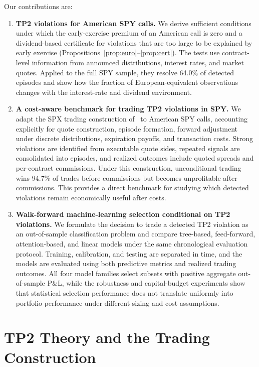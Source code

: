 \documentclass[sigconf,review,anonymous]{acmart}
\begin{document}
Our contributions are:
\begin{enumerate}
\item \textbf{TP2 violations for American SPY calls.}
We derive sufficient conditions under which the early-exercise premium of an American call is zero and a dividend-based certificate for violations that are too large to be explained by early exercise (Propositions~\ref{prop:euro}--\ref{prop:cert}). The tests use contract-level information from announced distributions, interest rates, and market quotes. Applied to the full SPY sample, they resolve 64.0\% of detected episodes and show how the fraction of European-equivalent observations changes with the interest-rate and dividend environment.
\item \textbf{A cost-aware benchmark for trading TP2 violations in SPY.}
We adapt the SPX trading construction of~\cite{glasserman2025tp2} to American SPY calls, accounting explicitly for quote construction, episode formation, forward adjustment under discrete distributions, expiration payoffs, and transaction costs. Strong violations are identified from executable quote sides, repeated signals are consolidated into episodes, and realized outcomes include quoted spreads and per-contract commissions. Under this construction, unconditional trading wins 94.7\% of trades before commissions but becomes unprofitable after commissions. This provides a direct benchmark for studying which detected violations remain economically useful after costs.
\item \textbf{Walk-forward machine-learning selection conditional on TP2 violations.}
We formulate the decision to trade a detected TP2 violation as an out-of-sample classification problem and compare tree-based, feed-forward, attention-based, and linear models under the same chronological evaluation protocol. Training, calibration, and testing are separated in time, and the models are evaluated using both predictive metrics and realized trading outcomes. All four model families select subsets with positive aggregate out-of-sample P\&L, while the robustness and capital-budget experiments show that statistical selection performance does not translate uniformly into portfolio performance under different sizing and cost assumptions.
\end{enumerate}

\section{TP2 Theory and the Trading Construction}
\label{sec:related}
\end{document}
